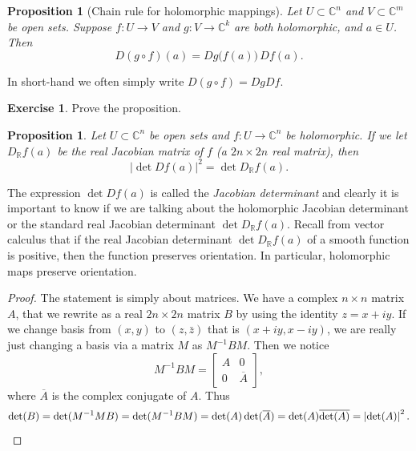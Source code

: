 \documentclass[12pt,openany]{book}
\newcommand{\abs}[1]{\left\lvert {#1} \right\rvert}
\newcommand{\C}{{\mathbb{C}}}
\newcommand{\R}{{\mathbb{R}}}
\newcommand{\myindex}[1]{#1\index{#1}}
\theoremstyle{plain}
\newtheorem{prop}[thm]{Proposition}
\theoremstyle{remark}
\theoremstyle{definition}
\newenvironment{exbox}{%
    \def\FrameCommand{\vrule width 1pt \relax\hspace {10pt}}%
    \MakeFramed {\advance \hsize -\width \FrameRestore }%
}{%
    \endMakeFramed
}
\theoremstyle{exercise}
\newtheorem{exercise}{Exercise}[section]
\theoremstyle{example}
\begin{document}
\begin{prop}[Chain rule for holomorphic mappings]
Let $U \subset \C^n$ and $V \subset \C^m$ be open sets.  Suppose
$f \colon U \to V$ and $g \colon V \to \C^k$ are both holomorphic,
and $a \in U$.  Then
\begin{equation*}
D(g \circ f)(a) = Dg\bigl(f(a)\bigr) \, Df(a) .
\end{equation*}
\end{prop}

In short-hand we often simply write $D(g \circ f) = Dg Df$.

\begin{exbox}
\begin{exercise}
Prove the proposition.
\end{exercise}
\end{exbox}

\begin{prop}
Let $U \subset \C^n$ be open sets and 
$f \colon U \to \C^n$ be holomorphic.  If we let $D_\R f (a)$ be the real
Jacobian matrix of $f$ (a $2n \times 2n$ real matrix), then
\begin{equation*}
\abs{\det D f(a) }^2 = 
\det D_\R f(a) .
\end{equation*}
\end{prop}

The expression $\det D f(a)$ is called the \emph{\myindex{Jacobian
determinant}} and clearly it is important to know if we are talking about
the holomorphic Jacobian determinant or the standard real Jacobian
determinant $\det D_\R f(a)$.  Recall from vector calculus that
if the real Jacobian determinant $\det D_\R
f(a)$ of a smooth function is positive, then the function preserves
orientation.  In particular, holomorphic maps preserve orientation.

\begin{proof}
The statement is simply about matrices.  We have a complex $n \times n$
matrix $A$, that we rewrite as a real $2n \times 2n$ matrix $B$ by using the
identity $z=x+iy$.  If we change basis from $(x,y)$ to $(z,\bar{z})$ that is
$(x+iy,x-iy)$, we are really just changing a basis via a matrix $M$ as
$M^{-1} B M$.  Then we notice
\begin{equation*}
M^{-1} B M =
\begin{bmatrix}
A & 0 \\
0 & \overline{A}
\end{bmatrix} ,
\end{equation*}
where $\overline{A}$ is the complex conjugate of $A$.  Thus
\begin{equation*}
\det (B) =
\det(M^{-1}M B)
=
\det(M^{-1} B M)
=
\det(A) \det(\overline{A})
=
\det(A) \overline{\det(A)}
=
\abs{\det(A)}^2 . \qedhere
\end{equation*}
\end{proof}
\end{document}
